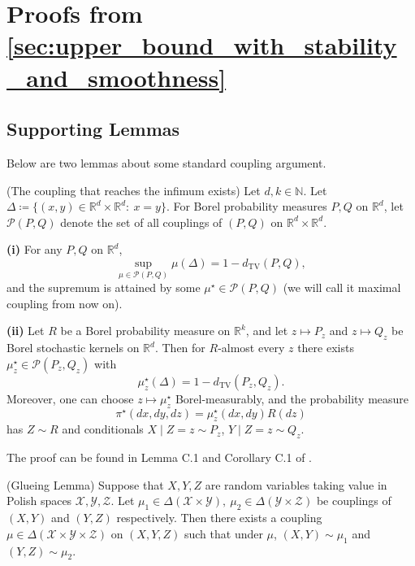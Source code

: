 \documentclass{article}
\begin{document}
\section{Proofs from \texorpdfstring{\cref{sec:upper_bound_with_stability_and_smoothness}}{Section 3}}





\subsection{Supporting Lemmas}
Below are two lemmas about some standard coupling argument. 


\begin{lemma}\textnormal{(The coupling that reaches the infimum exists)}\label{lemma:existence_of_rtvc_coupling}
Let $d,k\in\mathbb{N}$. Let $\Delta\coloneqq \{(x,y)\in\mathbb{R}^d\times\mathbb{R}^d:\ x=y\}$.
For Borel probability measures $P,Q$ on $\mathbb{R}^d$, let $\mathcal{P}(P,Q)$ denote the set of all couplings of $(P,Q)$ on $\mathbb{R}^d\times\mathbb{R}^d$.

\textbf{(i)}
For any $P,Q$ on $\mathbb{R}^d$,
\[
\sup_{\mu\in\mathcal{P}(P,Q)} \mu(\Delta) = 1 - d_{\mathrm{TV}}(P,Q),
\]
and the supremum is attained by some $\mu^\star\in\mathcal{P}(P,Q)$ (we will call it maximal coupling from now on).

\textbf{(ii)}
Let $R$ be a Borel probability measure on $\mathbb{R}^k$, and let $z\mapsto P_z$ and $z\mapsto Q_z$ be Borel stochastic kernels on $\mathbb{R}^d$. Then for $R$-almost every $z$ there exists $\mu_z^\star\in\mathcal{P}(P_z,Q_z)$ with
\[
\mu_z^\star(\Delta)=1-d_{\mathrm{TV}}(P_z,Q_z).
\]
Moreover, one can choose $z\mapsto\mu_z^\star$ Borel-measurably, and the probability measure
\[
\pi^\star(dx,dy,dz)=\mu_z^\star(dx,dy)R(dz)
\]
has $Z\sim R$ and conditionals $X\mid Z=z\sim P_z$, $Y\mid Z=z\sim Q_z$.
\end{lemma}

The proof can be found in Lemma C.1 and Corollary C.1 of \citet{block2023provable}.

\begin{lemma}\label{lemma:glueing_lemma}\textnormal{(Glueing Lemma)}
Suppose that $X, Y, Z$ are random variables taking value in Polish spaces $\mathcal{X}, \mathcal{Y}, \mathcal{Z}$. Let $\mu_1 \in \Delta(\mathcal{X} \times \mathcal{Y}), \ \mu_2 \in \Delta(\mathcal{Y} \times \mathcal{Z})$ be couplings of $(X,Y)$ and $(Y,Z)$ respectively. Then there exists a coupling $\mu \in \Delta(\mathcal{X} \times \mathcal{Y} \times \mathcal{Z})$ on $(X,Y,Z)$ such that under $\mu$, $(X,Y) \sim \mu_1$ and $(Y,Z) \sim \mu_2$.
\end{lemma}
\end{document}
